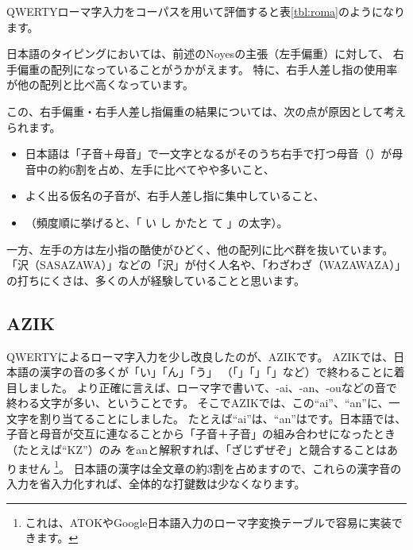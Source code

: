 QWERTYローマ字入力をコーパスを用いて評価すると表\ref{tbl:roma}のようになります。

日本語のタイピングにおいては、前述のNoyesの主張（左手偏重）に対して、
右手偏重の配列になっていることがうかがえます。
特に、右手人差し指の使用率が他の配列と比べ高くなっています。

この、右手偏重・右手人差し指偏重の結果については、次の点が原因として考えられます。
\begin{itemize}
\item 日本語は「子音＋母音」で一文字となるがそのうち右手で打つ母音（）が母音中の約6割を占め、左手に比べてやや多いこと、
\item よく出る仮名の子音が、右手人差し指に集中していること、
\item[　] \hspace{1zw}（頻度順に挙げると、「%
{\footnotesize い}%
%
%
{\footnotesize し}%
%
{\footnotesize かたと}%
%
{\footnotesize て}%
%
」の太字）。
\end{itemize}

一方、左手の方は左小指の酷使がひどく、他の配列に比べ群を抜いています。「沢（SASAZAWA）」などの「沢」が付く人名や、「わざわざ（WAZAWAZA）」の打ちにくさは、多くの人が経験していることと思います。


\subsection{AZIK}

QWERTYによるローマ字入力を少し改良したのが、AZIKです。
AZIKでは、日本語の漢字の音の多くが「い」「ん」「う」
（「」「」「」など）で終わることに着目しました。
より正確に言えば、ローマ字で書いて、-ai、-an、-ouなどの音で終わる文字が多い、ということです。
そこでAZIKでは、この``ai''、``an''に、一文字を割り当てることにしました。
たとえば``ai''は、``an''はです。日本語では、子音と母音が交互に連なることから「子音＋子音」の組み合わせになったとき（たとえば``KZ''）のみ
をanと解釈すれば、「ざじずぜぞ」と競合することはありません%
\footnote{これは、ATOKやGoogle日本語入力のローマ字変換テーブルで容易に実装できます。}。%
日本語の漢字は全文章の約3割を占めますので、これらの漢字音の入力を省入力化すれば、全体的な打鍵数は少なくなります。


